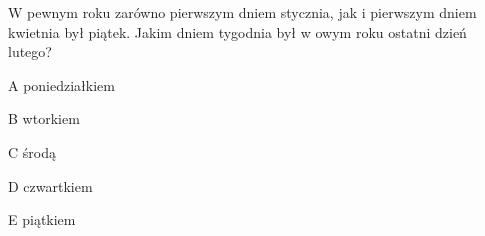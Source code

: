 \begin{tresc}
W pewnym roku zarówno pierwszym dniem stycznia, jak i pierwszym dniem kwietnia był piątek. Jakim dniem tygodnia był w owym roku ostatni dzień lutego?
\end{tresc}
\begin{wariant}{A} poniedziałkiem \end{wariant}
\begin{wariant}{B} wtorkiem \end{wariant}
\begin{wariant}{C} środą \end{wariant}
\begin{wariant}{D} czwartkiem \end{wariant}
\begin{wariant}{E} piątkiem \end{wariant}
